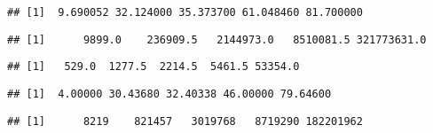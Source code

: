 \documentclass[]{article}
\newenvironment{Shaded}{\begin{snugshade}}{\end{snugshade}}
\newcommand{\KeywordTok}[1]{\textcolor[rgb]{0.13,0.29,0.53}{\textbf{#1}}}
\newcommand{\StringTok}[1]{\textcolor[rgb]{0.31,0.60,0.02}{#1}}
\newcommand{\OperatorTok}[1]{\textcolor[rgb]{0.81,0.36,0.00}{\textbf{#1}}}
\newcommand{\NormalTok}[1]{#1}
\begin{document}
\begin{verbatim}
## [1]  9.690052 32.124000 35.373700 61.048460 81.700000
\end{verbatim}

\begin{Shaded}
\end{Shaded}

\begin{verbatim}
## [1]      9899.0    236909.5   2144973.0   8510081.5 321773631.0
\end{verbatim}

\begin{Shaded}
\end{Shaded}

\begin{verbatim}
## [1]   529.0  1277.5  2214.5  5461.5 53354.0
\end{verbatim}

\begin{Shaded}
\end{Shaded}

\begin{verbatim}
## [1]  4.00000 30.43680 32.40338 46.00000 79.64600
\end{verbatim}

\begin{Shaded}
\end{Shaded}

\begin{verbatim}
## [1]      8219    821457   3019768   8719290 182201962
\end{verbatim}
\end{document}
